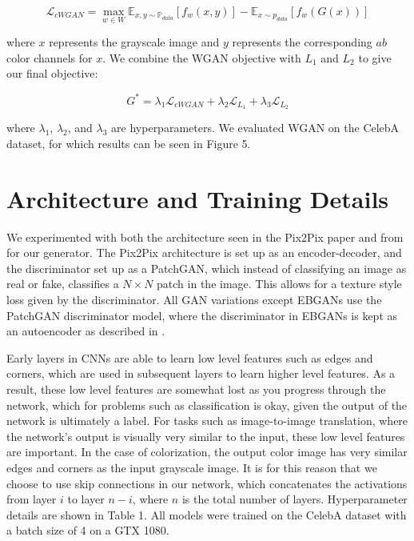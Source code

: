 \documentclass[10pt]{article}
\begin{document}
\[\mathcal{L}_{cWGAN} = \max\limits_{w \in W} \mathbb{E}_{x,y \sim \mathbb{P}_{data}}[f_w(x,y)] -
\mathbb{E}_{x \sim p_{data}}[f_w(G(x))]\]

\noindent where $x$ represents the grayscale image and $y$ represents the corresponding
$ab$ color channels for $x$. We combine the WGAN objective with $L_1$ and $L_2$ to give our final objective:

\[ G^* = \lambda_1 \mathcal{L}_{cWGAN} + \lambda_2 \mathcal{L}_{L_1} + \lambda_3 \mathcal{L}_{L_2} \]

\noindent where $\lambda_1$, $\lambda_2$, and $\lambda_3$ are hyperparameters. We evaluated WGAN on
the CelebA dataset, for which results can be seen in Figure 5. 

\section{Architecture and Training Details}
We experimented with both the architecture seen in the Pix2Pix paper \cite{isola2016image} and from \cite{zhang2016colorful} for our generator. The Pix2Pix architecture is set up as an
encoder-decoder, and the  discriminator set up as a PatchGAN, which instead of classifying an image as real or fake, classifies a $N \times N$ patch in the image. This allows for a texture
style loss given
by the discriminator. All GAN variations except EBGANs use the PatchGAN discriminator model, where the discriminator in EBGANs is kept as an autoencoder as described in \cite{zhao2016energy}.

Early layers in CNNs are able to learn low level features such as edges and corners, which are used in subsequent layers to learn higher level features. As a result, these low level features are
somewhat lost as you progress through the network, which for problems such as classification is okay, given the output of the network is ultimately a label. For tasks such as
image-to-image translation, where the network's output is visually very similar to the input, these low level features are important. In the case of colorization, the
output color image has very similar edges and corners as the input grayscale image. It is for this reason that we choose to use skip connections in our network, which concatenates the
activations from layer $i$ to layer $n-i$, where $n$ is the total number of layers. Hyperparameter details are shown in Table 1. All models were trained on the CelebA dataset with a batch size of 4
on a GTX 1080.
\end{document}
